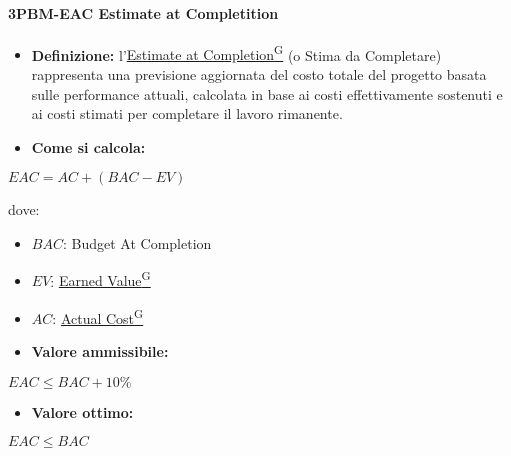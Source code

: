 \paragraph*{3PBM-EAC Estimate at Completition}
\begin{itemize}
    \item \textbf{Definizione:} l’\href{https://code7crusaders.github.io/docs/RTB/documentazione_interna/glossario.html#estimate-at-completion}{Estimate at Completion\textsuperscript{G}} (o Stima da Completare) rappresenta una previsione aggiornata del costo totale del progetto basata sulle performance attuali, calcolata in base ai costi effettivamente sostenuti e ai costi stimati per completare il lavoro rimanente.
    \item \textbf{Come si calcola:}
\end{itemize}
\begin{center}
   $EAC = AC + (BAC - EV)$ 
\end{center}
dove:
\begin{itemize}[label=$\rightarrow$]
    \item $BAC$: Budget At Completion
    \item $EV$: \href{https://code7crusaders.github.io/docs/RTB/documentazione_interna/glossario.html#earned-value}{Earned Value\textsuperscript{G}}
    \item $AC$: \href{https://code7crusaders.github.io/docs/RTB/documentazione_interna/glossario.html#actual-cost}{Actual Cost\textsuperscript{G}}
\end{itemize}
\begin{itemize}
    \item \textbf{Valore ammissibile:}
\end{itemize}
\begin{center}
    $EAC \leq BAC + 10\%$
\end{center}
\begin{itemize}
    \item \textbf{Valore ottimo:}
\end{itemize}
\begin{center}
    $EAC \leq BAC$
\end{center}

